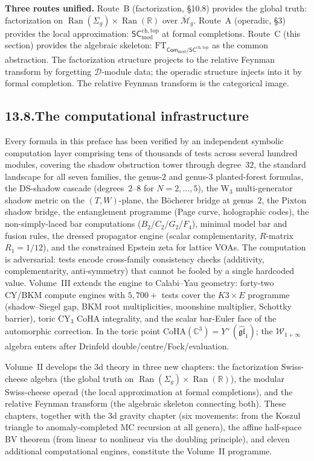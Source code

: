 \documentclass[11pt]{report}
\theoremstyle{definition}
\theoremstyle{remark}
\providecommand{\cM}{\mathcal{M}}
\providecommand{\cW}{\mathcal{W}}
\providecommand{\bC}{\mathbb{C}}
\numberwithin{equation}{section}
\begin{document}
\medskip
\noindent\textbf{Three routes unified.}\enspace
Route~B (factorization, \S10.8) provides the global truth:
factorization on $\operatorname{Ran}(\Sigma_g) \times
\operatorname{Ran}(\mathbb R)$ over $\overline{\cM}_g$.
Route~A (operadic, \S3) provides the local approximation:
$\mathsf{SC}^{\mathrm{ch,top}}_{\mathrm{mod}}$ at formal
completions. Route~C (this section) provides the algebraic
skeleton: $\mathrm{FT}_{\mathsf{Com}_{\mathrm{mod}} /
\mathsf{SC}^{\mathrm{ch,top}}}$ as the common abstraction.
The factorization structure projects to the relative Feynman
transform by forgetting $\mathcal D$-module data; the operadic
structure injects into it by formal completion. The relative
Feynman transform is the categorical image.

\subsection*{13.8.\enspace The computational infrastructure}

Every formula in this preface has been verified by an independent
symbolic computation layer comprising tens of thousands of tests
across several hundred modules, covering the shadow obstruction tower through
degree~$32$, the
standard landscape for all seven families, the genus-$2$ and
genus-$3$ planted-forest formulas, the DS-shadow cascade
(degrees~$2$--$8$ for $N=2,\ldots,5$), the W$_3$ multi-generator
shadow metric on the $(T,W)$-plane, the B\"ocherer bridge at
genus~$2$, the Pixton shadow bridge, the entanglement programme
(Page curve, holographic codes), the non-simply-laced bar
computations ($B_2$/$C_2$/$G_2$/$F_4$), minimal model bar and
fusion rules, the dressed propagator engine (scalar
complementarity, $R$-matrix $R_1=1/12$), and the constrained
Epstein zeta for lattice VOAs. The computation is adversarial:
tests encode cross-family consistency checks (additivity,
complementarity, anti-symmetry) that cannot be fooled by a single
hardcoded value. Volume~III extends the engine to Calabi--Yau
geometry: forty-two CY/BKM compute engines with $5{,}700{+}$ tests
cover the $K3 \times E$ programme (shadow--Siegel gap, BKM root
multiplicities, moonshine multiplier, Schottky barrier), toric
CY$_3$ CoHA integrality, and the scalar bar-Euler face of the
automorphic correction. In the toric point
$\mathrm{CoHA}(\bC^3)=Y^+(\widehat{\mathfrak{gl}}_1)$; the
$\cW_{1+\infty}$ algebra enters after Drinfeld
double/centre/Fock/evaluation.

Volume~II develops the $3$d theory in three new chapters: the
factorization Swiss-cheese algebra (the global truth on
$\operatorname{Ran}(\Sigma_g)\times\operatorname{Ran}(\mathbb R)$),
the modular Swiss-cheese operad (the local approximation at formal
completions), and the relative Feynman transform (the algebraic
skeleton connecting both). These chapters, together with the
$3$d gravity chapter (six movements: from the Koszul triangle to
anomaly-completed MC recursion at all genera), the affine half-space
BV theorem (from linear to nonlinear via the doubling principle),
and eleven additional computational engines, constitute the
Volume~II programme.
\end{document}
